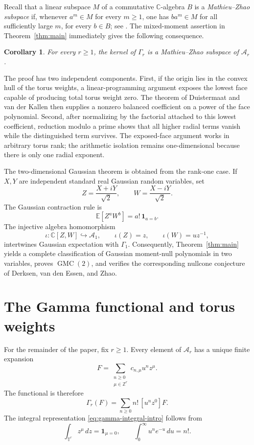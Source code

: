 \documentclass[11pt]{article}
\numberwithin{equation}{section}
\newtheorem{corollary}[theorem]{Corollary}
\theoremstyle{definition}
\theoremstyle{remark}
\newcommand{\C}{\mathbb C}
\newcommand{\Z}{\mathbb Z}
\newcommand{\T}{\mathbb T}
\newcommand{\E}{\mathbb E}
\newcommand{\A}{\mathcal A}
\newcommand{\GMC}{\operatorname{GMC}}
\begin{document}
Recall that a linear subspace $M$ of a commutative $\C$-algebra $B$ is a
\emph{Mathieu--Zhao subspace} if, whenever $a^m\in M$ for every $m\ge1$,
one has $ba^m\in M$ for all sufficiently large $m$, for every $b\in B$;
see \cite{Zhao2012}.  The mixed-moment assertion in
Theorem~\ref{thm:main} immediately gives the following consequence.

\begin{corollary}\label{cor:mz-intro}
For every $r\ge1$, the kernel of $\Gamma_r$ is a Mathieu--Zhao subspace of
$\A_r$.
\end{corollary}

The proof has two independent components.  First, if the origin lies in the
convex hull of the torus weights, a linear-programming argument exposes the
lowest face capable of producing total torus weight zero.  The theorem of
Duistermaat and van der Kallen then supplies a nonzero balanced coefficient
on a power of the face polynomial.  Second, after normalizing by the
factorial attached to this lowest coefficient, reduction modulo a prime
shows that all higher radial terms vanish while the distinguished term
survives.  The exposed-face argument works in arbitrary torus rank; the
arithmetic isolation remains one-dimensional because there is only one
radial exponent.

The two-dimensional Gaussian theorem is obtained from the rank-one case.
If $X,Y$ are independent standard real Gaussian random variables, set
\begin{equation}\label{eq:circular-intro}
  Z=\frac{X+iY}{\sqrt2},
  \qquad
  W=\frac{X-iY}{\sqrt2}.
\end{equation}
The Gaussian contraction rule is
\[
  \E[Z^aW^b]=a!\,\mathbf 1_{a=b}.
\]
The injective algebra homomorphism
\begin{equation}\label{eq:iota-intro}
  \iota:\C[Z,W]\hookrightarrow\A_1,
  \qquad
  \iota(Z)=z,
  \qquad
  \iota(W)=uz^{-1},
\end{equation}
intertwines Gaussian expectation with $\Gamma_1$.  Consequently,
Theorem~\ref{thm:main} yields a complete classification of Gaussian
moment-null polynomials in two variables, proves $\GMC(2)$, and verifies the
corresponding nullcone conjecture of Derksen, van den Essen, and Zhao.

\section{The Gamma functional and torus weights}

For the remainder of the paper, fix $r\ge1$.  Every element of $\A_r$ has a
unique finite expansion
\[
  F=\sum_{\substack{n\ge0\\ \mu\in\Z^r}}c_{n,\mu}u^nz^\mu.
\]
The functional is therefore
\begin{equation}\label{eq:gamma-coefficients}
  \Gamma_r(F)=\sum_{n\ge0}n!\,[u^nz^0]F.
\end{equation}
The integral representation \eqref{eq:gamma-integral-intro} follows from
\[
  \int_{\T^r}z^\mu\,dz=\mathbf 1_{\mu=0},
  \qquad
  \int_0^\infty u^ne^{-u}\,du=n!.
\]
\end{document}
